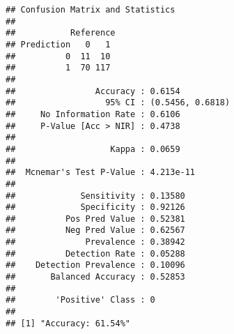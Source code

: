 \documentclass[
]{article}
\newenvironment{Shaded}{\begin{snugshade}}{\end{snugshade}}
\newcommand{\CommentTok}[1]{\textcolor[rgb]{0.56,0.35,0.01}{\textit{#1}}}
\newcommand{\ControlFlowTok}[1]{\textcolor[rgb]{0.13,0.29,0.53}{\textbf{#1}}}
\newcommand{\DecValTok}[1]{\textcolor[rgb]{0.00,0.00,0.81}{#1}}
\newcommand{\FunctionTok}[1]{\textcolor[rgb]{0.13,0.29,0.53}{\textbf{#1}}}
\newcommand{\NormalTok}[1]{#1}
\newcommand{\OtherTok}[1]{\textcolor[rgb]{0.56,0.35,0.01}{#1}}
\newcommand{\SpecialCharTok}[1]{\textcolor[rgb]{0.81,0.36,0.00}{\textbf{#1}}}
\newcommand{\StringTok}[1]{\textcolor[rgb]{0.31,0.60,0.02}{#1}}
\begin{document}
\begin{verbatim}
## Confusion Matrix and Statistics
## 
##           Reference
## Prediction   0   1
##          0  11  10
##          1  70 117
##                                           
##                Accuracy : 0.6154          
##                  95% CI : (0.5456, 0.6818)
##     No Information Rate : 0.6106          
##     P-Value [Acc > NIR] : 0.4738          
##                                           
##                   Kappa : 0.0659          
##                                           
##  Mcnemar's Test P-Value : 4.213e-11       
##                                           
##             Sensitivity : 0.13580         
##             Specificity : 0.92126         
##          Pos Pred Value : 0.52381         
##          Neg Pred Value : 0.62567         
##              Prevalence : 0.38942         
##          Detection Rate : 0.05288         
##    Detection Prevalence : 0.10096         
##       Balanced Accuracy : 0.52853         
##                                           
##        'Positive' Class : 0               
##                                           
## [1] "Accuracy: 61.54%"
\end{verbatim}

\begin{Shaded}
\end{Shaded}
\end{document}
